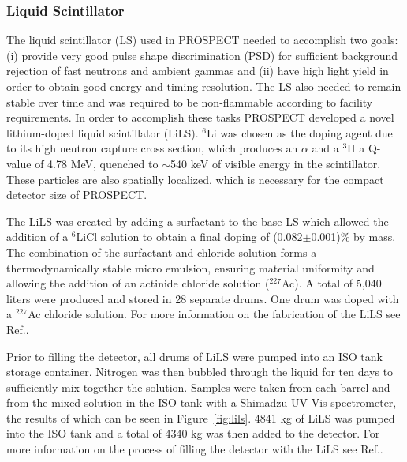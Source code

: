 \subsubsection{Liquid Scintillator}

The liquid scintillator (LS) used in PROSPECT needed to accomplish two goals: (i) provide very good pulse shape discrimination (PSD) for sufficient background rejection of fast neutrons and ambient gammas and (ii) have high light yield in order to obtain good energy and timing resolution. 
The LS also needed to remain stable over time and was required to be non-flammable according to facility requirements. 
In order to accomplish these tasks PROSPECT developed a novel lithium-doped liquid scintillator (LiLS). 
$^6$Li was chosen as the doping agent due to its high neutron capture cross section, which produces an $\alpha$ and a $^3$H a Q-value of 4.78 MeV, quenched to $\sim$540 keV of visible energy in the scintillator. 
These particles are also spatially localized, which is necessary for the compact detector size of PROSPECT.

The LiLS was created by adding a surfactant to the base LS which allowed the addition of a $^6$LiCl solution to obtain a final doping of (0.082$\pm$0.001)\% by mass. 
The combination of the surfactant and chloride solution forms a thermodynamically stable micro emulsion, ensuring material uniformity and allowing the addition of an actinide chloride solution ($^{227}$Ac). 
A total of 5,040 liters were produced and stored in 28 separate drums. 
One drum was doped with a $^{227}$Ac chloride solution. 
For more information on the fabrication of the LiLS see Ref.\cite{Ashenfelter:2019iqj}.

Prior to filling the detector, all drums of LiLS were pumped into an ISO tank storage container. 
Nitrogen was then bubbled through the liquid for ten days to sufficiently mix together the solution.
Samples were taken from each barrel and from the mixed solution in the ISO tank with a Shimadzu UV-Vis spectrometer, the results of which can be seen in Figure~\ref{fig:lils}.
4841 kg of LiLS was pumped into the ISO tank and a total of 4340 kg was then added to the detector. 
For more information on the process of filling the detector with the LiLS see Ref.\cite{LongNIM}.

